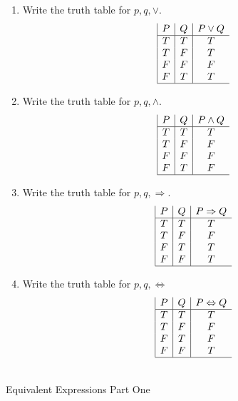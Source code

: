 \documentclass[12pt]{article}
\begin{document}
\begin{enumerate}
\item Write the truth table for $p,q, \vee$.
\begin{displaymath}
\begin{array}{|c|c|c}
   P
 & Q
 & P\lor{}Q \\
\hline
T & T & T \\
T & F & T \\
F & F & F \\
F & T & T \\
\hline
\end{array}
\end{displaymath}
\item Write the truth table for $p,q, \wedge$.
\begin{displaymath}
\begin{array}{|c|c|c}
   P
 & Q
 & P\land{}Q \\
\hline
T & T & T \\
T & F & F \\
F & F & F \\
F & T & F \\
\hline
\end{array}
\end{displaymath}
\item Write the truth table for $p,q, \Rightarrow{}$.
\begin{displaymath}
\begin{array}{|c|c|c}
   P
 & Q
 & P\Rightarrow{}Q \\
\hline
T & T & T \\
T & F & F \\
F & T & T \\
F & F & T \\
\hline
\end{array}
\end{displaymath}
\item Write  the truth table for $p,q, \Leftrightarrow{}$
\begin{displaymath}
\begin{array}{|c|c|c}
   P
 & Q
 & P\Leftrightarrow{}Q \\
\hline
T & T & T \\
T & F & F \\
F & T & F \\
F & F & T \\
\hline
\end{array}
\end{displaymath}
\end{enumerate} ~\\
\problem Equivalent Expressions Part One
\end{document}
